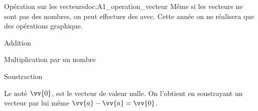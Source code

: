 \begin{doc}{Opération sur les vecteurs}{doc:A1_operation_vecteur}
  Même si les vecteurs ne sont pas des nombres, on peut effectuer des  avec.
  Cette année on ne réalisera que des opérations graphique.
  \begin{multicols}{3}
    \centering
    \begin{boite} \vAligne{50pt} \end{boite}
    Addition
    
    \begin{boite} \vAligne{50pt} \end{boite}
    Multiplication par un nombre

    \begin{boite} \vAligne{50pt} \end{boite}
    Soustraction
  \end{multicols}

  \begin{importants}
    Le  noté $\vv{0}$, est le vecteur de valeur nulle.
    On l'obtient en soustrayant un vecteur par lui même $\vv{a} - \vv{a} = \vv{0}$.
  \end{importants}
\end{doc}
